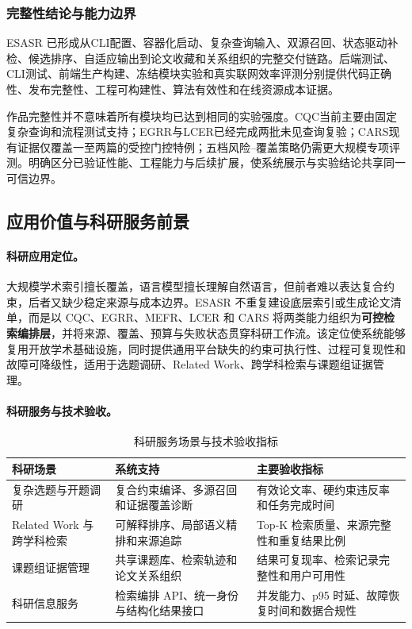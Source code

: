 \documentclass[a4paper,12pt,fontset=none]{ctexart}
\begin{document}
\subsubsection{完整性结论与能力边界}

ESASR 已形成从CLI配置、容器化启动、复杂查询输入、双源召回、状态驱动补检、候选排序、自适应输出到论文收藏和关系组织的完整交付链路。后端测试、CLI测试、前端生产构建、冻结模块实验和真实联网效率评测分别提供代码正确性、发布完整性、工程可构建性、算法有效性和在线资源成本证据。

作品完整性并不意味着所有模块均已达到相同的实验强度。CQC当前主要由固定复杂查询和流程测试支持；EGRR与LCER已经完成两批未见查询复验；CARS现有证据仅覆盖一至两篇的受控门控特例；五档风险--覆盖策略仍需更大规模专项评测。明确区分已验证性能、工程能力与后续扩展，使系统展示与实验结论共享同一可信边界。


\subsection{应用价值与科研服务前景}

\paragraph{科研应用定位。}

大规模学术索引擅长覆盖，语言模型擅长理解自然语言，但前者难以表达复合约束，后者又缺少稳定来源与成本边界。ESASR 不重复建设底层索引或生成论文清单，而是以 CQC、EGRR、MEFR、LCER 和 CARS 将两类能力组织为\textbf{可控检索编排层}，并将来源、覆盖、预算与失败状态贯穿科研工作流。该定位使系统能够复用开放学术基础设施，同时提供通用平台缺失的约束可执行性、过程可复现性和故障可降级性，适用于选题调研、Related Work、跨学科检索与课题组证据管理。

\paragraph{科研服务与技术验收。}

\begin{table}[H]
\centering
\caption{科研服务场景与技术验收指标}
\begin{tabularx}{\textwidth}{C{3.0cm} Y Y}
\toprule
\textbf{科研场景} & \textbf{系统支持} & \textbf{主要验收指标} \\
\midrule
复杂选题与开题调研 & 复合约束编译、多源召回和证据覆盖诊断 & 有效论文率、硬约束违反率和任务完成时间 \\
Related Work 与跨学科检索 & 可解释排序、局部语义精排和来源追踪 & Top-K 检索质量、来源完整性和重复结果比例 \\
课题组证据管理 & 共享课题库、检索轨迹和论文关系组织 & 结果可复现率、检索记录完整性和用户可用性 \\
科研信息服务 & 检索编排 API、统一身份与结构化结果接口 & 并发能力、p95 时延、故障恢复时间和数据合规性 \\
\bottomrule
\end{tabularx}
\end{table}
\end{document}
